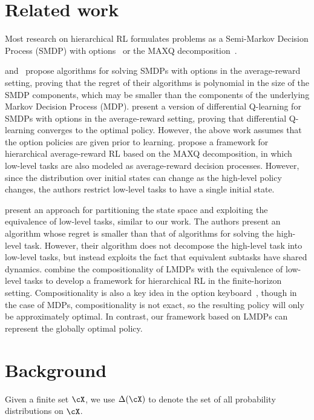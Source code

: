 \section{Related work}
Most research on hierarchical RL formulates problems as a Semi-Markov Decision Process (SMDP) with options~\citep{Sutton1999} or the MAXQ decomposition~\citep{Dietterich2000}.

\citet{Fruit2017} and~\cite{Fruit2017b} propose algorithms for solving SMDPs with options in the average-reward setting, proving that the regret of their algorithms is polynomial in the size of the SMDP components, which may be smaller than the components of the underlying Markov Decision Process (MDP).
\citet{Wan2021a} present a version of differential Q-learning for SMDPs with options in the average-reward setting, proving that differential Q-learning converges to the optimal policy.
However, the above work assumes that the option policies are given prior to learning.
\citet{Ghavamzadeh2007} propose a framework for hierarchical average-reward RL based on the MAXQ decomposition, in which low-level tasks are also modeled as average-reward decision processes.
However, since the distribution over initial states can change as the high-level policy changes, the authors restrict low-level tasks to have a single initial state.

\citet{Wen2020} present an approach for partitioning the state space and exploiting the equivalence of low-level tasks, similar to our work. The authors present an algorithm whose regret is smaller than that of algorithms for solving the high-level task.
However, their algorithm does not decompose the high-level task into low-level tasks, but instead exploits the fact that equivalent subtasks have shared dynamics. 
\citet{Infante2022} combine the compositionality of LMDPs with the equivalence of low-level tasks to develop a framework for hierarchical RL in the finite-horizon setting.
Compositionality is also a key idea in the option keyboard~\citep{Barreto2019}, though in the case of MDPs, compositionality is not exact, so the resulting policy will only be approximately optimal.
In contrast, our framework based on LMDPs can represent the globally optimal policy.

\section{Background}

Given a finite set $\cX$, we use $\Delta(\cX)$ to denote the set of all probability distributions on $\cX$.

